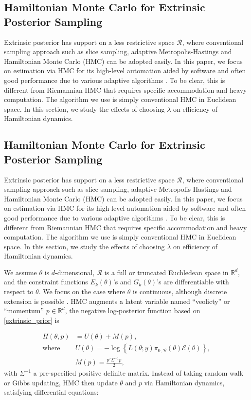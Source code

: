 \documentclass[10pt]{article}
\newcommand{\mc}[1]{\mathcal{#1}}
\DeclareMathOperator{\1}{\mathbbm{1}}
\begin{document}
\subsection{Hamiltonian Monte Carlo for Extrinsic Posterior Sampling}

Extrinsic posterior has support on a less restrictive space $\mc R$, where conventional sampling approach such as slice sampling, adaptive Metropolis-Hastings and Hamiltonian Monte Carlo (HMC) can be adopted easily. In this paper, we focus on estimation via HMC for its high-level automation aided by software and often good performance due to various adaptive algorithms \citep{hoffman2014no}. To be clear, this is different from Riemannian HMC that requires specific accommodation and heavy computation. The algorithm we use is simply conventional HMC in Euclidean space. In this section, we study the effects of choosing $\lambda$ on efficiency of Hamiltonian dynamics.


\subsection{Hamiltonian Monte Carlo for Extrinsic Posterior Sampling}

Extrinsic posterior has support on a less restrictive space $\mc R$, where conventional sampling approach such as slice sampling, adaptive Metropolis-Hastings and Hamiltonian Monte Carlo (HMC) can be adopted easily. In this paper, we focus on estimation via HMC for its high-level automation aided by software and often good performance due to various adaptive algorithms \citep{hoffman2014no}. To be clear, this is different from Riemannian HMC that requires specific accommodation and heavy computation. The algorithm we use is simply conventional HMC in Euclidean space. In this section, we study the effects of choosing $\lambda$ on efficiency of Hamiltonian dynamics.

We assume $\theta$ is $d$-dimensional, $\mc R$ is a full or truncated Euchledean space in $\mathbb R^d$, and the constraint functions $E_k(\theta)$'s and $G_k(\theta)$'s  are differentiable with respect to $\theta$. We focus on the case where $\theta$ is continuous, although discrete extension is possible \citep{zhang2012continuous}. HMC augments a latent variable named ``veolicty'' or ``momentum'' $p\in \mathbb R^d$, the negative log-posterior function based on \eqref{extrinsic_prior} is

\begin{equation}
\begin{aligned}
H(\theta, p)& = U(\theta)+M(p),\\
\text{where } & U(\theta) = -\log\left\{ L(\theta;y)\pi_{0,\mc R}(\theta) \mc{E}(\theta) \right\},\\
& M(p) = \frac{p'\Sigma^{-1} p}{2},\end{aligned}
\end{equation}
with $\Sigma^{-1}$ a pre-specified positive definite matrix. Instead of taking random walk or Gibbs updating, HMC then update $\theta$ and $p$ via Hamiltonian dynamics, satisfying differential equations:
\end{document}
